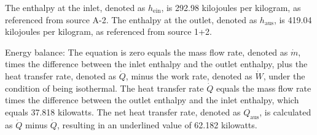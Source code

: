 The enthalpy at the inlet, denoted as \( h_{\text{ein}} \), is 292.98 kilojoules per kilogram, as referenced from source A-2. The enthalpy at the outlet, denoted as \( h_{\text{aus}} \), is 419.04 kilojoules per kilogram, as referenced from source 1+2.

Energy balance:
The equation is zero equals the mass flow rate, denoted as \( \dot{m} \), times the difference between the inlet enthalpy and the outlet enthalpy, plus the heat transfer rate, denoted as \( \dot{Q} \), minus the work rate, denoted as \( \dot{W} \), under the condition of being isothermal. The heat transfer rate \( \dot{Q} \) equals the mass flow rate times the difference between the outlet enthalpy and the inlet enthalpy, which equals 37.818 kilowatts. The net heat transfer rate, denoted as \( Q_{\text{aus}} \), is calculated as \( \dot{Q} \) minus \( \dot{Q} \), resulting in an underlined value of 62.182 kilowatts.
